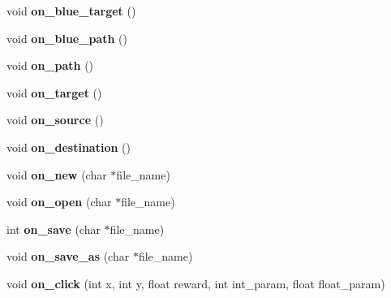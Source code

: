 \begin{DoxyCompactItemize}
\item 
\hypertarget{classCAppCore_afdf7a8b43902314d2bce59c911e03875}{void {\bfseries on\-\_\-blue\-\_\-target} ()}\label{classCAppCore_afdf7a8b43902314d2bce59c911e03875}

\item 
\hypertarget{classCAppCore_a5ffe15c359542e54c74ac143b9f9b365}{void {\bfseries on\-\_\-blue\-\_\-path} ()}\label{classCAppCore_a5ffe15c359542e54c74ac143b9f9b365}

\item 
\hypertarget{classCAppCore_af260c7ee90c0a15dc969481a9e68af6f}{void {\bfseries on\-\_\-path} ()}\label{classCAppCore_af260c7ee90c0a15dc969481a9e68af6f}

\item 
\hypertarget{classCAppCore_a7133018150a92d20af4bead70b432daa}{void {\bfseries on\-\_\-target} ()}\label{classCAppCore_a7133018150a92d20af4bead70b432daa}

\item 
\hypertarget{classCAppCore_a10c24671c7a89350617e0af1ebaf551b}{void {\bfseries on\-\_\-source} ()}\label{classCAppCore_a10c24671c7a89350617e0af1ebaf551b}

\item 
\hypertarget{classCAppCore_a6b63f68df27983152f6296d2ccf6b170}{void {\bfseries on\-\_\-destination} ()}\label{classCAppCore_a6b63f68df27983152f6296d2ccf6b170}

\item 
\hypertarget{classCAppCore_a7cf59303761924f9cb1600ae782da547}{void {\bfseries on\-\_\-new} (char $\ast$file\-\_\-name)}\label{classCAppCore_a7cf59303761924f9cb1600ae782da547}

\item 
\hypertarget{classCAppCore_afd25a537a58484ca61d9aafaa7559e9d}{void {\bfseries on\-\_\-open} (char $\ast$file\-\_\-name)}\label{classCAppCore_afd25a537a58484ca61d9aafaa7559e9d}

\item 
\hypertarget{classCAppCore_aa31fe8e8ed383b69915aabec51069cc0}{int {\bfseries on\-\_\-save} (char $\ast$file\-\_\-name)}\label{classCAppCore_aa31fe8e8ed383b69915aabec51069cc0}

\item 
\hypertarget{classCAppCore_afe555240f879f62da546cc684213b298}{void {\bfseries on\-\_\-save\-\_\-as} (char $\ast$file\-\_\-name)}\label{classCAppCore_afe555240f879f62da546cc684213b298}

\item 
\hypertarget{classCAppCore_af17c2ffdba2ca5a8a1d295871eff6660}{void {\bfseries on\-\_\-click} (int x, int y, float reward, int int\-\_\-param, float float\-\_\-param)}\label{classCAppCore_af17c2ffdba2ca5a8a1d295871eff6660}


\end{DoxyCompactItemize}
